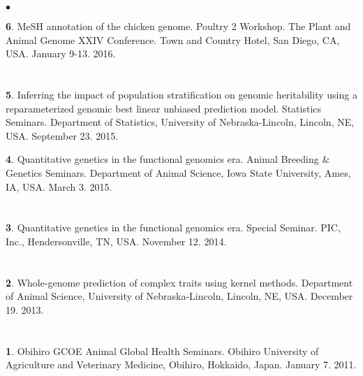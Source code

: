 \documentclass[margin,line,10pt]{res}
\newenvironment{list1}{
  \begin{list}{\ding{113}}{%
      \setlength{\itemsep}{0in}
      \setlength{\parsep}{0in} \setlength{\parskip}{0in}
      \setlength{\topsep}{0in} \setlength{\partopsep}{0in} 
      \setlength{\leftmargin}{0.17in}}}{\end{list}}
\newenvironment{list2}{
  \begin{list}{$\bullet$}{%
      \setlength{\itemsep}{0in}
      \setlength{\parsep}{0in} \setlength{\parskip}{0in}
      \setlength{\topsep}{0in} \setlength{\partopsep}{0in} 
      \setlength{\leftmargin}{0.2in}}}{\end{list}}
\begin{document}
\begin{resume}
\begin{list2}
  \vspace{0.5cm}
  
  \item [{\bf 6}.] MeSH annotation of the chicken genome. Poultry 2 Workshop. The Plant and Animal Genome XXIV Conference. Town and Country Hotel, San Diego, CA, USA. January 9-13. 2016.
  
\end{list2}

\section{}
\begin{list1}
\item [{\bf 5}.] Inferring the impact of population stratification on genomic heritability using a reparameterized genomic best linear unbiased prediction model. Statistics Seminars. Department of Statistics, University of Nebraska-Lincoln, Lincoln, NE, USA. September 23. 2015.

  \vspace{0.5cm}

\item [{\bf 4}.] Quantitative genetics in the functional genomics era. Animal Breeding \& Genetics Seminars. Department of Animal Science, Iowa State University, Ames, IA, USA. March 3. 2015.
\end{list1}

\section{}
\begin{list1}
\item [{\bf 3}.] Quantitative genetics in the functional genomics era. Special Seminar. PIC, Inc., Hendersonville, TN, USA.  November 12. 2014.
\end{list1}

\section{}
\begin{list1}
\item [{\bf 2}.] Whole-genome prediction of complex traits using kernel methods. Department of Animal Science, University of Nebraska-Lincoln, Lincoln, NE, USA. December 19. 2013.
\end{list1}

\section{}
\begin{list1}
\item [{\bf 1}.] Obihiro GCOE Animal Global Health Seminars.  Obihiro University of Agriculture and  Veterinary Medicine, Obihiro, Hokkaido, Japan. January 7. 2011.
\end{list1}  




\end{resume}
\end{document}
